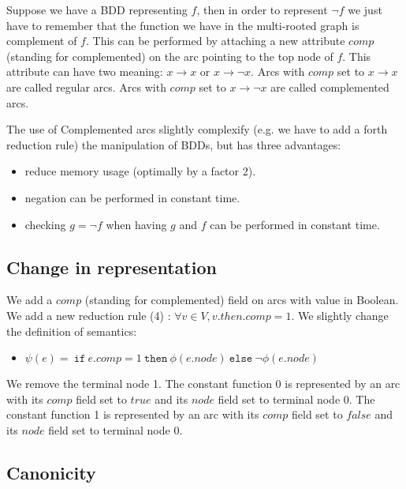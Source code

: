 \documentclass[a4paper,10pt]{article}
\begin{document}
Suppose we have a BDD representing $f$, then in order to represent $\lnot f$ we just have to remember that the function we have in the multi-rooted graph is complement of $f$.
This can be performed by attaching a new attribute $comp$ (standing for complemented) on the arc pointing to the top node of $f$.
This attribute can have two meaning: $x \rightarrow x$ or $x \rightarrow \lnot x$.
Arcs with $comp$ set to $x \rightarrow x$ are called regular arcs.
Arcs with $comp$ set to $x \rightarrow \lnot x$ are called complemented arcs.


The use of Complemented arcs slightly complexify (e.g. we have to add a forth reduction rule) the manipulation of BDDs, but has three advantages:\begin{itemize}
\item reduce memory usage (optimally by a factor 2).
\item negation can be performed in constant time.
\item checking $g = \lnot f$ when having $g$ and $f$ can be performed in constant time.
\end{itemize}

\subsection{Change in representation}
We add a $comp$ (standing for complemented) field on arcs with value in Boolean.
We add a new reduction rule (4) : $\forall v\in V, v.then.comp = 1$.
We slightly change the definition of semantics:\begin{itemize}
  \item $\psi(e) =\mathtt{~if~}e.comp = 1\mathtt{~then~}\phi(e.node)\mathtt{~else~}\lnot \phi(e.node)$
\end{itemize}
We remove the terminal node 1.
The constant function 0 is represented by an arc with its $comp$ field set to $true$ and its $node$ field set to terminal node $0$.
The constant function 1 is represented by an arc with its $comp$ field set to $false$ and its $node$ field set to terminal node $0$.


\subsection{Canonicity}
\end{document}
